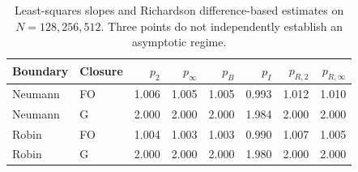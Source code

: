 \begin{table}[htbp]
\centering
\footnotesize
\setlength{\tabcolsep}{4pt}
\begin{tabular}{llrrrrrr}
\toprule
Boundary & Closure & $p_2$ & $p_\infty$ & $p_B$ & $p_I$ & $p_{R,2}$ & $p_{R,\infty}$ \\
\midrule
Neumann & FO & 1.006 & 1.005 & 1.005 & 0.993 & 1.012 & 1.010 \\
Neumann & G & 2.000 & 2.000 & 2.000 & 1.984 & 2.000 & 2.000 \\
Robin & FO & 1.004 & 1.003 & 1.003 & 0.990 & 1.007 & 1.005 \\
Robin & G & 2.000 & 2.000 & 2.000 & 1.980 & 2.000 & 2.000 \\
\bottomrule
\end{tabular}
\caption{Least-squares slopes and Richardson difference-based estimates on $N=128,256,512$. Three points do not independently establish an asymptotic regime.}
\label{tab:fitted-global}
\end{table}
